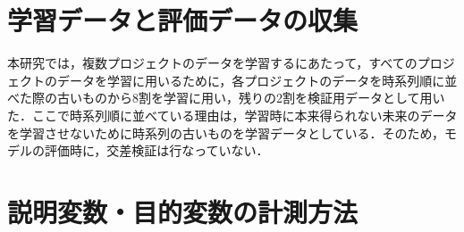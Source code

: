 \documentclass[11pt,dvipdfmx]{jreport}
\begin{document}

\section{学習データと評価データの収集}

本研究では，複数プロジェクトのデータを学習するにあたって，すべてのプロジェクトのデータを学習に用いるために，各プロジェクトのデータを時系列順に並べた際の古いものから8割を学習に用い，残りの2割を検証用データとして用いた．ここで時系列順に並べている理由は，学習時に本来得られない未来のデータを学習させないために時系列の古いものを学習データとしている．そのため，モデルの評価時に，交差検証は行なっていない．





\section{説明変数・目的変数の計測方法}
\end{document}
